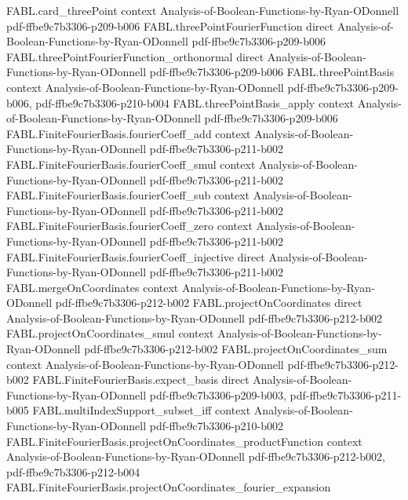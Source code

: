 \begin{theorem}
\proofstep
  {FABL.card_threePoint}
  {context}
  {Analysis-of-Boolean-Functions-by-Ryan-ODonnell}
  {pdf-ffbe9c7b3306-p209-b006}
\proofstep
  {FABL.threePointFourierFunction}
  {direct}
  {Analysis-of-Boolean-Functions-by-Ryan-ODonnell}
  {pdf-ffbe9c7b3306-p209-b006}
\proofstep
  {FABL.threePointFourierFunction_orthonormal}
  {direct}
  {Analysis-of-Boolean-Functions-by-Ryan-ODonnell}
  {pdf-ffbe9c7b3306-p209-b006}
\proofstep
  {FABL.threePointBasis}
  {context}
  {Analysis-of-Boolean-Functions-by-Ryan-ODonnell}
  {pdf-ffbe9c7b3306-p209-b006,
    pdf-ffbe9c7b3306-p210-b004}
\proofstep
  {FABL.threePointBasis_apply}
  {context}
  {Analysis-of-Boolean-Functions-by-Ryan-ODonnell}
  {pdf-ffbe9c7b3306-p209-b006}
\proofstep
  {FABL.FiniteFourierBasis.fourierCoeff_add}
  {context}
  {Analysis-of-Boolean-Functions-by-Ryan-ODonnell}
  {pdf-ffbe9c7b3306-p211-b002}
\proofstep
  {FABL.FiniteFourierBasis.fourierCoeff_smul}
  {context}
  {Analysis-of-Boolean-Functions-by-Ryan-ODonnell}
  {pdf-ffbe9c7b3306-p211-b002}
\proofstep
  {FABL.FiniteFourierBasis.fourierCoeff_sub}
  {context}
  {Analysis-of-Boolean-Functions-by-Ryan-ODonnell}
  {pdf-ffbe9c7b3306-p211-b002}
\proofstep
  {FABL.FiniteFourierBasis.fourierCoeff_zero}
  {context}
  {Analysis-of-Boolean-Functions-by-Ryan-ODonnell}
  {pdf-ffbe9c7b3306-p211-b002}
\proofstep
  {FABL.FiniteFourierBasis.fourierCoeff_injective}
  {direct}
  {Analysis-of-Boolean-Functions-by-Ryan-ODonnell}
  {pdf-ffbe9c7b3306-p211-b002}
\proofstep
  {FABL.mergeOnCoordinates}
  {context}
  {Analysis-of-Boolean-Functions-by-Ryan-ODonnell}
  {pdf-ffbe9c7b3306-p212-b002}
\proofstep
  {FABL.projectOnCoordinates}
  {direct}
  {Analysis-of-Boolean-Functions-by-Ryan-ODonnell}
  {pdf-ffbe9c7b3306-p212-b002}
\proofstep
  {FABL.projectOnCoordinates_smul}
  {context}
  {Analysis-of-Boolean-Functions-by-Ryan-ODonnell}
  {pdf-ffbe9c7b3306-p212-b002}
\proofstep
  {FABL.projectOnCoordinates_sum}
  {context}
  {Analysis-of-Boolean-Functions-by-Ryan-ODonnell}
  {pdf-ffbe9c7b3306-p212-b002}
\proofstep
  {FABL.FiniteFourierBasis.expect_basis}
  {direct}
  {Analysis-of-Boolean-Functions-by-Ryan-ODonnell}
  {pdf-ffbe9c7b3306-p209-b003,
    pdf-ffbe9c7b3306-p211-b005}
\proofstep
  {FABL.multiIndexSupport_subset_iff}
  {context}
  {Analysis-of-Boolean-Functions-by-Ryan-ODonnell}
  {pdf-ffbe9c7b3306-p210-b002}
\proofstep
  {FABL.FiniteFourierBasis.projectOnCoordinates_productFunction}
  {context}
  {Analysis-of-Boolean-Functions-by-Ryan-ODonnell}
  {pdf-ffbe9c7b3306-p212-b002,
    pdf-ffbe9c7b3306-p212-b004}
\proofstep
  {FABL.FiniteFourierBasis.projectOnCoordinates_fourier_expansion}

\end{theorem}
